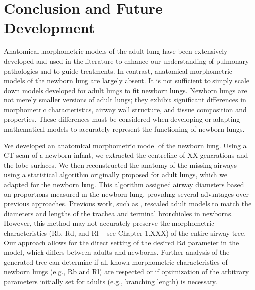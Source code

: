 

\section{Conclusion and Future Development}


Anatomical morphometric models of the adult lung have been extensively
developed and used in the literature to enhance our understanding of
pulmonary pathologies and to guide treatments. In contrast, anatomical
morphometric models of the newborn lung are largely absent. It is not
sufficient to simply scale down models developed for adult lungs to
fit newborn lungs. Newborn lungs are not merely smaller versions of
adult lungs; they exhibit significant differences in morphometric
characteristics, airway wall structure, and tissue composition and
properties. These differences must be considered when developing or
adapting mathematical models to accurately represent the functioning
of newborn lungs.

We developed an anatomical morphometric model of the newborn
lung. Using a CT scan of a newborn infant, we extracted the centreline
of XX generations and the lobe surfaces. We then reconstructed the
anatomy of the missing airways using a statistical algorithm
originally proposed for adult lungs, which we adapted for the newborn
lung. This algorithm assigned airway diameters based on proportions
measured in the newborn lung, providing several advantages over
previous approaches. Previous work, such as \textcite{mani2020},
rescaled adult models to match the diameters and lengths of the
trachea and terminal bronchioles in newborns. However, this method may
not accurately preserve the morphometric characteristics (Rb, Rd, and
Rl – see Chapter 1.XXX) of the entire airway tree. Our approach allows
for the direct setting of the desired Rd parameter in the model, which
differs between adults and newborns. Further analysis of the generated
tree can determine if all known morphometric characteristics of
newborn lungs (e.g., Rb and Rl) are respected or if optimization of
the arbitrary parameters initially set for adults (e.g., branching
length) is necessary.

